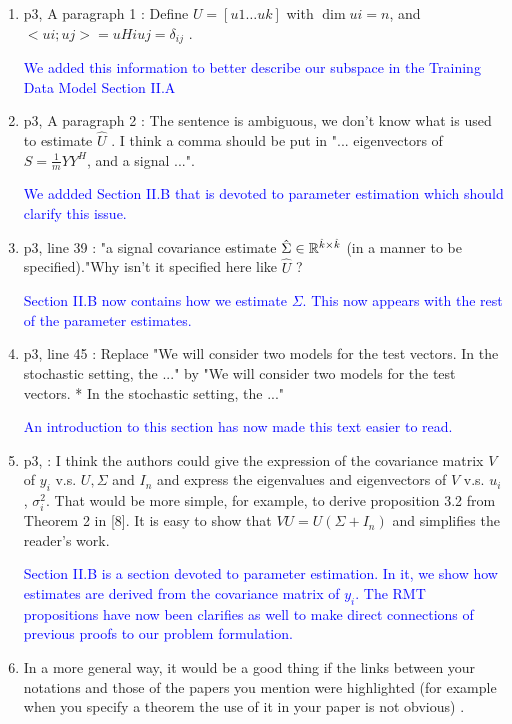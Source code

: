 \documentclass[11pt]{article}
\begin{document}
\begin{enumerate}
\item p3, A paragraph 1 : Define $U = [u1\dots uk]$ with $\dim ui = n$, and $< ui; uj >= uH
i uj = \delta_{ij}$ .

\textcolor{blue}{We added this information to better describe our subspace in the Training Data Model Section II.A}

\item p3, A paragraph 2 : The sentence is ambiguous, we don't know what is used to estimate $\hat{U}$ . I think a
comma should be put in "... eigenvectors of $S=\frac{1}{m}YY^H$, and a signal ...".

\textcolor{blue}{We addded Section II.B that is devoted to parameter estimation which should clarify this issue.}

\item p3, line 39 : "a signal covariance estimate $\hat{\Sigma}\in\mathbb{R}^{\hat{k}\times\hat{k}}$ (in a manner to be specified)."Why isn't it specified
here like $\hat{U}$ ?

\textcolor{blue}{Section II.B now contains how we estimate $\Sigma$. This now appears with the rest of the parameter estimates.}

\item p3, line 45 : Replace "We will consider two models for the test vectors. In the stochastic setting, the ..."
by "We will consider two models for the test vectors.
* In the stochastic setting, the ..."

\textcolor{blue}{An introduction to this section has now made this text easier to read.}

\item p3, : I think the authors could give the expression of the covariance matrix $V$ of $y_i$ v.s. $U,\Sigma$ and $I_n$ and
express the eigenvalues and eigenvectors of $V$ v.s. $u_i$, $\sigma_i^2$. That would be more simple, for example, to derive
proposition 3.2 from Theorem 2 in [8]. It is easy to show that $V U = U(\Sigma + I_n)$ and simplifies the reader's
work.

\textcolor{blue}{Section II.B is a section devoted to parameter estimation. In it, we show how estimates are derived from the covariance matrix of $y_i$. The RMT propositions have now been clarifies as well to make direct connections of previous proofs to our problem formulation.}

\item In a more general way, it would be a good thing if the links between your notations and those of the
papers you mention were highlighted (for example when you specify a theorem the use of it in your paper is
not obvious) .


\end{enumerate}
\end{document}

